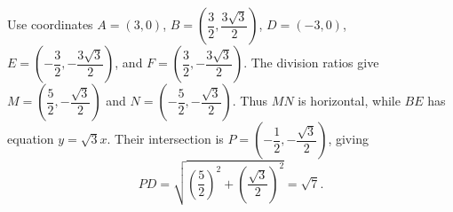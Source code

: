 Use coordinates $A=(3,0)$, $B=(\dfrac{3}{2},\dfrac{3\sqrt3}{2})$, $D=(-3,0)$, $E=(-\dfrac{3}{2},-\dfrac{3\sqrt3}{2})$, and $F=(\dfrac{3}{2},-\dfrac{3\sqrt3}{2})$. The division ratios give $M=(\dfrac{5}{2},-\dfrac{\sqrt3}{2})$ and $N=(-\dfrac{5}{2},-\dfrac{\sqrt3}{2})$. Thus $MN$ is horizontal, while $BE$ has equation $y=\sqrt3x$. Their intersection is $P=(-\dfrac{1}{2},-\dfrac{\sqrt3}{2})$, giving
\[PD=\sqrt{\left(\dfrac{5}{2}\right)^2+\left(\dfrac{\sqrt3}{2}\right)^2}=\boxed{\sqrt7}.\]

